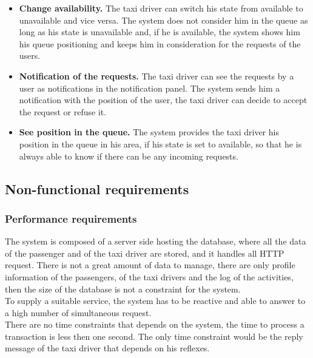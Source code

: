 \documentclass[18pt,oneside,a4paper, titlepage]{article}
\begin{document}
\begin{itemize}
			\item \textbf{Change availability.}
				The taxi driver can switch his state from available to unavailable and vice versa. The system does not consider him in the queue as long as his state is unavailable and, if he is available, the system shows him his queue positioning and keeps him in consideration for the requests of the users.
				
			\item \textbf{Notification of the requests.}
				The taxi driver can see the requests by a user as notifications in the notification panel. The system sends him a notification with the position of the user, the taxi driver can decide to accept the request or refuse it.
				
			\item \textbf{See position in the queue.}
				The system provides the taxi driver his position in the queue in his area, if his state is set to available, so that he is always able to know if there can be any incoming requests.
				
		\end{itemize}
	\subsection{Non-functional requirements}
		\subsubsection{Performance requirements}
			The system is composed of a server side hosting the database, where all the data of the passenger and of the taxi driver are stored, and it handles all HTTP request. There is not a great amount of data to manage, there are only profile information of the passengers, of the taxi drivers and the log of the activities, then the size of the database is not a constraint for the system.\\ To supply a suitable service, the system has to be reactive and able to answer to a high number of simultaneous request.\\ There are no time constraints that depends on the system, the time to process a transaction is less then one second. The only time constraint would be the reply message of the taxi driver that depends on his reflexes.
\end{document}
